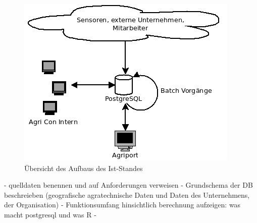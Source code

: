 \begin{figure}[h]
\centering
\includegraphics[width=\textwidth]{Abbildungen/Ist-Stand.png}
\caption[Aufbau Ist-Stand]{\"{U}bersicht des Aufbaus des Ist-Standes}
\label{fig:iststand}
\end{figure}


- quelldaten benennen und auf Anforderungen verweisen
- Grundschema der DB beschreieben (geografische agratechnische Daten und Daten des Unternehmens, der Organisation)
- Funktionsumfang hinsichtlich berechnung aufzeigen: was macht postgresql und was R
- 